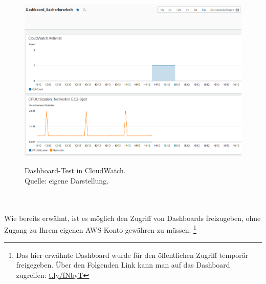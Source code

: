 \begin{figure}[h!]
  \centering
  \includegraphics[scale=0.6]{sources/CloudWatchDashboardTest}
  \caption[Dashboard-Test in CloudWatch]{}
  \label{fig:CloudWatchDashboardTest} 
  Dashboard-Test in CloudWatch.\\
  Quelle: eigene Darstellung.
\end{figure}
\\\\
Wie bereits erwähnt, ist es möglich den Zugriff von Dashboards freizugeben, ohne Zugang zu Ihrem eigenen AWS-Konto gewähren zu müssen. \footnote{Das hier erwähnte Dashboard wurde für den öffentlichen Zugriff temporär freigegeben. Über den Folgenden Link kann man auf das Dashboard zugreifen: \url{t.ly/fNbyT}} %
